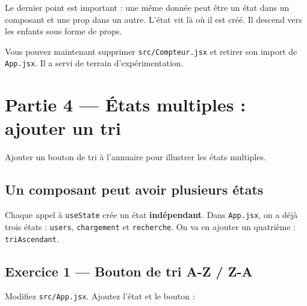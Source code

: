 \documentclass[11pt,a4paper]{article}
\begin{document}
Le dernier point est important : une même donnée peut être un état dans un composant et une prop dans un autre. L'état vit là où il est créé. Il descend vers les enfants sous forme de props.

Vous pouvez maintenant supprimer \texttt{src/Compteur.jsx} et retirer son import de \texttt{App.jsx}. Il a servi de terrain d'expérimentation.

\section{Partie 4 --- États multiples : ajouter un tri}
\label{sec:tri}

\begin{objectifbox}
Ajouter un bouton de tri à l'annuaire pour illustrer les états multiples.
\end{objectifbox}

\subsection{Un composant peut avoir plusieurs états}

Chaque appel à \texttt{useState} crée un état \textbf{indépendant}. Dans \texttt{App.jsx}, on a déjà trois états : \texttt{users}, \texttt{chargement} et \texttt{recherche}. On va en ajouter un quatrième : \texttt{triAscendant}.

\subsection{Exercice 1 --- Bouton de tri A-Z / Z-A}

Modifiez \texttt{src/App.jsx}. Ajoutez l'état et le bouton :
\end{document}
